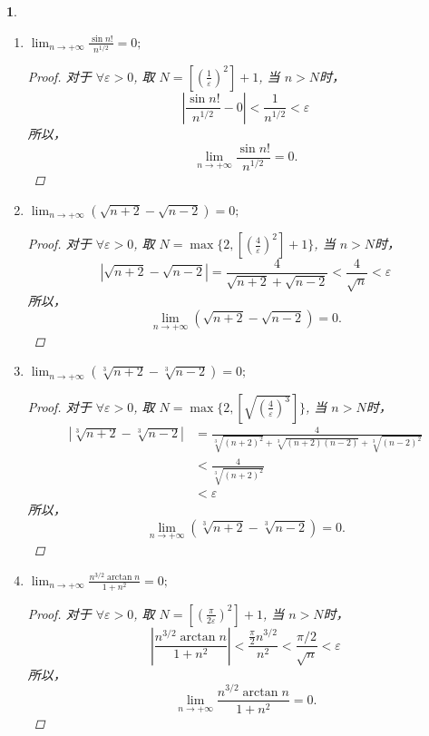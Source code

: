 \documentclass[utf8]{book}
\newtheorem{example}{}[section]             %
\begin{document}
\begin{example}
\begin{enumerate}
        \item $\displaystyle \lim_{n\to +\infty}\frac{\sin n!}{n^{1/2}} = 0;$
        \begin{proof}
         对于 $\forall \varepsilon > 0$, 取 $N = \left [ \left(\frac{1}{\varepsilon}\right)^2\right ] + 1$, 当 $n > N$时，
        $$\left | \frac{\sin n!}{n^{1/2}} - 0\right | < \frac{1}{n^{1/2}} < \varepsilon$$
        所以， $$\lim_{n\to +\infty}\frac{\sin n!}{n^{1/2}} = 0.$$  
        \end{proof}
        
        \item $\displaystyle \lim_{n\to +\infty}(\sqrt{n+2}-\sqrt{n-2}) = 0;$
        \begin{proof}
         对于 $\forall \varepsilon > 0$, 取 $N = \max\{2, \left [ \left(\frac{4}{\varepsilon}\right)^2\right ] + 1\}$, 当 $n > N$时，
        $$\left | \sqrt{n+2}-\sqrt{n-2}\right | = \frac{4}{\sqrt{n+2}+\sqrt{n-2}} < \frac{4}{\sqrt{n}} < \varepsilon$$
        所以， $$\lim_{n\to +\infty}(\sqrt{n+2}-\sqrt{n-2}) = 0.$$  
        \end{proof}
        
        \item $\displaystyle \lim_{n\to +\infty}(\sqrt[3]{n+2}-\sqrt[3]{n-2}) = 0;$
        \begin{proof}
         对于 $\forall \varepsilon > 0$, 取 $N = \max\{2, \left [ \sqrt{\left(\frac{4}{\varepsilon}\right)^3}\right ]\}$, 当 $n > N$时，
         \begin{equation*}
         \begin{split}
		\left | \sqrt[3]{n+2}-\sqrt[3]{n-2}\right | &= \frac{4}{\sqrt[3]{(n+2)^2}+\sqrt[3]{(n+2)(n-2)} + \sqrt[3]{(n-2)^2}} \\
 													 &< \frac{4}{\sqrt[3]{(n+2)^2}} \\
													 &< \varepsilon
		\end{split}
		\end{equation*}
        所以， $$\lim_{n\to +\infty}(\sqrt[3]{n+2}-\sqrt[3]{n-2}) = 0.$$  
        \end{proof}
        
        \item $\displaystyle \lim_{n\to +\infty}\frac{n^{3/2}\arctan{n}}{1+n^2} = 0;$
        \begin{proof}
         对于 $\forall \varepsilon > 0$, 取 $N = \left [ \left(\frac{\pi}{2\varepsilon}\right)^2\right ] + 1$, 当 $n > N$时，
         $$\left | \frac{n^{3/2}\arctan{n}}{1+n^2} \right | < \frac{\frac{\pi}{2}n^{3/2}}{n^2} < \frac{\pi / 2}{\sqrt{n}} < \varepsilon$$
        所以， $$\lim_{n\to +\infty}\frac{n^{3/2}\arctan{n}}{1+n^2} = 0.$$  
        \end{proof} 
        

\end{enumerate}
\end{example}
\end{document}
